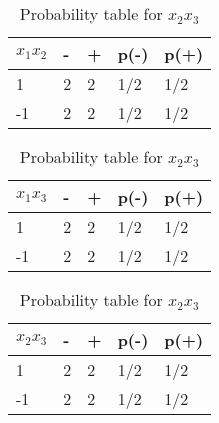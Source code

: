 \documentclass[a4 paper]{article}
\begin{document}
\begin{enumerate}
\begin{table}[!htb]
    \begin{minipage}{.33\linewidth}
      \centering
      \caption{Probability table for $x_1x_2$}
		\begin{tabular}{|l||l|l|l|l|} \hline 
			$x_1x_2$  & - & + & p(-) & p(+) \\ \hline \hline
			1  &  2 &  2 &  1/2   &   1/2   \\ \hline
			-1 & 2  &  2 &   1/2   &   1/2   \\ \hline
		\end{tabular}
    \end{minipage}%
    \begin{minipage}{.33\linewidth}
      \centering
      \caption{Probability table for $x_1x_3$}
		\begin{tabular}{|l||l|l|l|l|} \hline 
			$x_1x_3$  & - & + & p(-) & p(+) \\ \hline \hline
			1  &  2 &  2 &  1/2   &   1/2   \\ \hline
			-1 & 2  &  2 &   1/2   &   1/2   \\ \hline
		\end{tabular}
    \end{minipage} %
        \begin{minipage}{.33\linewidth}
      \centering
      \caption{Probability table for $x_2x_3$}
 		\begin{tabular}{|l||l|l|l|l|} \hline 
			$x_2x_3$  & - & + & p(-) & p(+) \\ \hline \hline
			1  &  2 &  2 &  1/2   &   1/2   \\ \hline
			-1 & 2  &  2 &   1/2   &   1/2   \\ \hline
		\end{tabular}
    \end{minipage} 
    

\end{table}
\end{enumerate}
\end{document}
